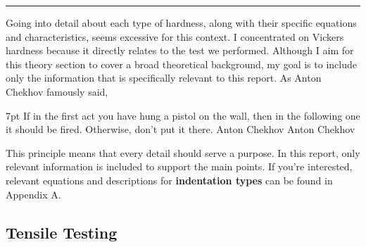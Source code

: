 \documentclass{article}
\newcommand{\formalsource}{} %
\newenvironment{formal}[1][]{%
    \renewcommand{\formalsource}{#1}%
    \def\FrameCommand{%
        \hspace{1pt}%
        {\color{gray}\vrule width 2pt}%
        {\color{white}\vrule width 4pt}%
        \colorbox{white}%
    }%
    \MakeFramed{\advance\hsize-\width\FrameRestore}%
    \noindent\hspace{-4.55pt}%
    \begin{adjustwidth}{}{7pt}%
        \vspace{2pt}%
    }%
    {%
        \vspace{4pt}%
        \ifx\formalsource\empty %
        \else
        \hfill{\footnotesize{\formalsource}}%
        \fi
    \end{adjustwidth}\endMakeFramed%
}
\begin{document}
    \hrule\vspace{1em}
    Going into detail about each type of hardness, along with their specific equations and characteristics, seems excessive for this context. I concentrated on Vickers hardness because it directly relates to the test we performed. Although I aim for this theory section to cover a broad theoretical background, my goal is to include only the information that is specifically relevant to this report. As Anton Chekhov famously said, \begin{formal}[Anton Chekhov]{If in the first act you have hung a pistol on the wall, then in the following one it should be fired. Otherwise, don't put it there.}\end{formal} This principle means that every detail should serve a purpose. In this report, only relevant information is included to support the main points. If you're interested, relevant equations and descriptions for \textbf{indentation types} can be found in Appendix A.
    
    \newpage

    \subsection{Tensile Testing}
    
\end{document}

